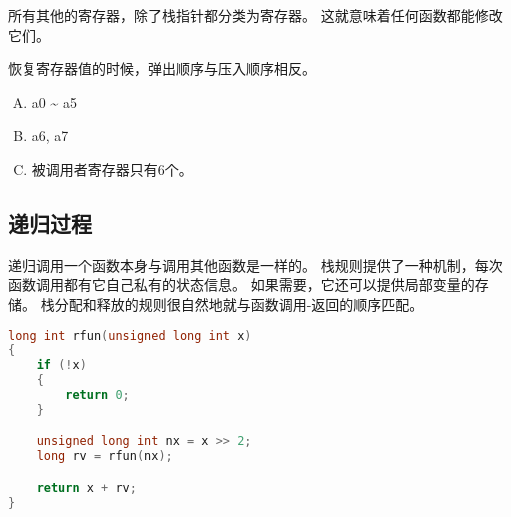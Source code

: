 {{        所有其他的寄存器，除了栈指针都分类为寄存器。
        这就意味着任何函数都能修改它们。

        恢复寄存器值的时候，弹出顺序与压入顺序相反。

        \begin{practicec}
            \begin{enumerate}[A.]
                \item a0 \~{} a5
                \item a6, a7
                \item 被调用者寄存器只有6个。
            \end{enumerate}
        \end{practicec}
    }

    \subsection{递归过程}
    {
        递归调用一个函数本身与调用其他函数是一样的。
        栈规则提供了一种机制，每次函数调用都有它自己私有的状态信息。
        如果需要，它还可以提供局部变量的存储。
        栈分配和释放的规则很自然地就与函数调用-返回的顺序匹配。

        \begin{practicec}
            \begin{lstlisting}[language=C]
long int rfun(unsigned long int x)
{
    if (!x)
    {
        return 0;
    }

    unsigned long int nx = x >> 2;
    long rv = rfun(nx);

    return x + rv;
}
            \end{lstlisting}
        \end{practicec}
    }
}
